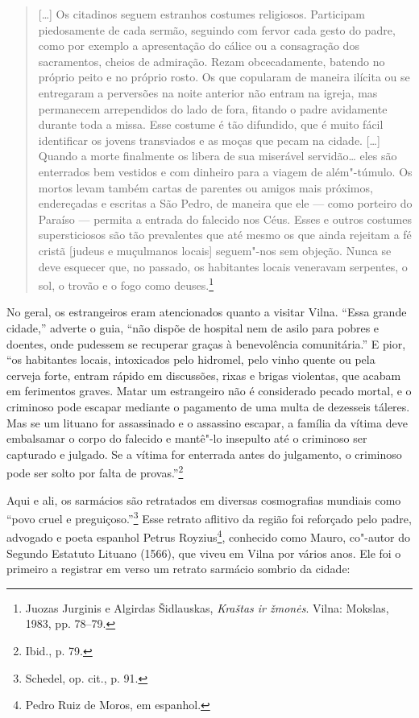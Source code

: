 \begin{quote}
[\ldots{}] Os citadinos seguem estranhos costumes religiosos. Participam
piedosamente de cada sermão, seguindo com fervor cada gesto do padre,
como por exemplo a apresentação do cálice ou a consagração dos
sacramentos, cheios de admiração. Rezam obcecadamente, batendo no
próprio peito e no próprio rosto. Os que copularam de maneira ilícita ou
se entregaram a perversões na noite anterior não entram na igreja, mas
permanecem arrependidos do lado de fora, fitando o padre avidamente
durante toda a missa. Esse costume é tão difundido, que é muito fácil
identificar os jovens transviados e as moças que pecam na cidade.
[\ldots{}] Quando a morte finalmente os libera de sua miserável
servidão\ldots{} eles são enterrados bem vestidos e com dinheiro para a
viagem de além"-túmulo. Os mortos levam também cartas de parentes ou
amigos mais próximos, endereçadas e escritas a São Pedro, de maneira que
ele --- como porteiro do Paraíso --- permita a entrada do falecido nos Céus.
Esses e outros costumes supersticiosos são tão prevalentes que até mesmo
os que ainda rejeitam a fé cristã {[}judeus e muçulmanos locais{]}
seguem"-nos sem objeção. Nunca se deve esquecer que, no passado, os
habitantes locais veneravam serpentes, o sol, o trovão e o fogo como
deuses.\footnote{Juozas Jurginis e Algirdas Šidlauskas, \textit{Kraštas ir žmonės}. Vilna: Mokslas, 1983, pp. 78--79.}
\end{quote}

No geral, os estrangeiros eram atencionados quanto a visitar Vilna.
``Essa grande cidade,'' adverte o guia, ``não dispõe de hospital nem de
asilo para pobres e doentes, onde pudessem se recuperar graças à
benevolência comunitária.'' E pior, ``os habitantes locais, intoxicados
pelo hidromel, pelo vinho quente ou pela cerveja forte, entram rápido em
discussões, rixas e brigas violentas, que acabam em ferimentos graves.
Matar um estrangeiro não é considerado pecado mortal, e o criminoso pode
escapar mediante o pagamento de uma multa de dezesseis táleres. Mas se
um lituano for assassinado e o assassino escapar, a família da vítima
deve embalsamar o corpo do falecido e mantê"-lo insepulto até o criminoso
ser capturado e julgado. Se a vítima for enterrada antes do julgamento,
o criminoso pode ser solto por falta de provas.''\footnote{Ibid., p. 79.}

Aqui e ali, os sarmácios são retratados em diversas cosmografias
mundiais como ``povo cruel e preguiçoso.''\footnote{Schedel, op. cit., p. 91.} Esse retrato aflitivo da região foi reforçado pelo padre, advogado e poeta espanhol Petrus Royzius\footnote{Pedro Ruiz de Moros, em espanhol.}, conhecido como Mauro,
co"-autor do Segundo Estatuto Lituano (1566), que viveu em Vilna por
vários anos. Ele foi o primeiro a registrar em verso um retrato sarmácio
sombrio da cidade:


